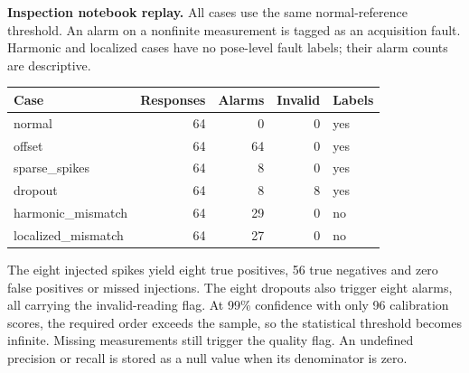 \medskip\textbf{Inspection notebook replay.} All cases use the same normal-reference threshold. An alarm on a nonfinite measurement is tagged as an acquisition fault. Harmonic and localized cases have no pose-level fault labels; their alarm counts are descriptive.

\begin{center}\small\begin{tabular}{@{}lrrrl@{}}\toprule
Case & Responses & Alarms & Invalid & Labels\\\midrule
normal & 64 & 0 & 0 & yes\\
offset & 64 & 64 & 0 & yes\\
sparse\_spikes & 64 & 8 & 0 & yes\\
dropout & 64 & 8 & 8 & yes\\
harmonic\_mismatch & 64 & 29 & 0 & no\\
localized\_mismatch & 64 & 27 & 0 & no\\
\bottomrule\end{tabular}\end{center}

The eight injected spikes yield eight true positives, 56 true negatives and zero false positives or missed injections. The eight dropouts also trigger eight alarms, all carrying the invalid-reading flag. At 99\% confidence with only 96 calibration scores, the required order exceeds the sample, so the statistical threshold becomes infinite. Missing measurements still trigger the quality flag. An undefined precision or recall is stored as a null value when its denominator is zero.